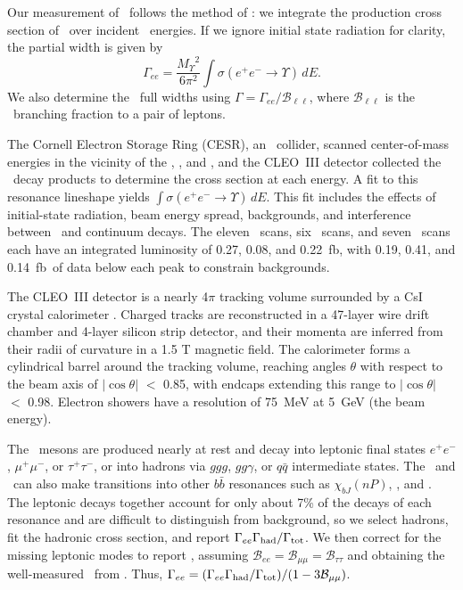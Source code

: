 \documentclass[aps,prl,twocolumn,superscriptaddress,showpacs,floatfix]{revtex4}
\begin{document}
Our measurement of \gee\ follows the method of \cite{pdg}: we
integrate the production cross section of \ups\ over incident \ee\
energies.  If we ignore initial state radiation for clarity, the
partial width is given by
\begin{equation}
\label{eqn:gee}
\Gamma_{ee} = \frac{{M_\Upsilon}^2}{6\pi^2}\int \sigma(e^+e^- \to
\Upsilon) \, dE \mbox{.}
\end{equation}
We also determine the \ups\ full widths using $\Gamma =
\Gamma_{ee}/{\mathcal B}_{\ell\ell}$, where ${\mathcal B}_{\ell\ell}$
is the \ups\ branching fraction to a pair of leptons.

The Cornell Electron Storage Ring (CESR), an \ee\ collider, scanned
center-of-mass energies in the vicinity of the \us, \uss, and \usss,
and the CLEO~III detector collected the \ups\ decay products to
determine the cross section at each energy.  A fit to this resonance
lineshape yields $\int \sigma(e^+e^- \to \Upsilon) \, dE$.  This fit
includes the effects of initial-state radiation, beam energy spread,
backgrounds, and interference between \ups\ and continuum decays.  The
eleven \us\ scans, six \uss\ scans, and seven \usss\ scans each have
an integrated luminosity of 0.27, 0.08, and 0.22~fb\inv, with 0.19,
0.41, and 0.14~fb\inv\ of data below each peak to constrain
backgrounds.

The CLEO~III detector is a nearly 4$\pi$ tracking volume surrounded by
a CsI crystal calorimeter \cite{cleoiii} \cite{driii}.  Charged tracks
are reconstructed in a 47-layer wire drift chamber and 4-layer silicon
strip detector, and their momenta are inferred from their radii of
curvature in a 1.5 T magnetic field.  The calorimeter forms a
cylindrical barrel around the tracking volume, reaching angles
$\theta$ with respect to the beam axis of $|\cos\theta|$ $<$ 0.85,
with endcaps extending this range to $|\cos\theta|$ $<$ 0.98.
Electron showers have a resolution of 75~MeV at 5~GeV (the beam
energy).

The \ups\ mesons are produced nearly at rest and decay into leptonic
final states $e^+e^-$, $\mu^+\mu^-$, or $\tau^+\tau^-$, or into
hadrons via $ggg$, $gg\gamma$, or $q\bar{q}$ intermediate states.  The
\uss\ and \usss\ can also make transitions into other $b\bar{b}$
resonances such as $\chi_{bJ}(nP)$, \us, and \uss.  The leptonic
decays together account for only about 7\% of the decays of each
resonance and are difficult to distinguish from background, so we
select hadrons, fit the hadronic cross section, and report
$\Gamma_{ee}\Gamma_{\mbox{\scriptsize had}}/\Gamma_{\mbox{\scriptsize tot}}$.  We then correct for the missing leptonic modes to
report \gee, assuming ${\mathcal B}_{ee} = {\mathcal B}_{\mu\mu} =
{\mathcal B}_{\tau\tau}$ and obtaining the well-measured \bmm\ from
\cite{istvan}.  Thus, $\Gamma_{ee} = (\Gamma_{ee}\Gamma_{\mbox{\scriptsize had}}/\Gamma_{\mbox{\scriptsize tot}})/(1 - 3{\mathcal
B}_{\mu\mu})$.
\end{document}
